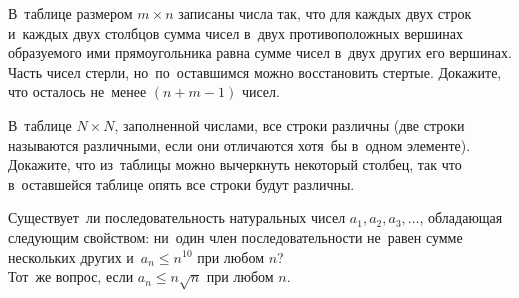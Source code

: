\begin{problems}
\item
В~таблице размером $m \times n$ записаны числа так, что для каждых двух строк
и~каждых двух столбцов сумма чисел в~двух противоположных вершинах образуемого
ими прямоугольника равна сумме чисел в~двух других его вершинах.
Часть чисел стерли, но~по~оставшимся можно восстановить стертые.
Докажите, что осталось не~менее $(n + m - 1)$ чисел.

\item
В~таблице $N \times N$, заполненной числами, все строки различны (две строки
называются различными, если они отличаются хотя~бы в~одном элементе).
Докажите, что из~таблицы можно вычеркнуть некоторый столбец, так что
в~оставшейся таблице опять все строки будут различны.

\item
\subproblem
Существует~ли последовательность натуральных чисел $a_1, a_2, a_3, \ldots$,
обладающая следующим свойством: ни~один член последовательности не~равен сумме
нескольких других и~$a_n \leq n^{10}$ при любом $n$?
\\
\subproblem
Тот~же вопрос, если $a_n \leq n \sqrt{n}$ при любом $n$.

\end{problems}

